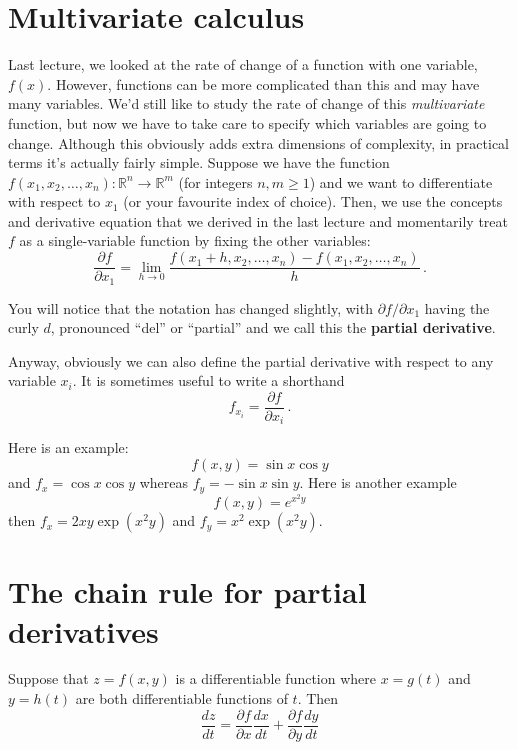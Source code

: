 \documentclass[12pt]{article}
\begin{document}
\section*{Multivariate calculus}
Last lecture, we looked at the rate of change of a function with one variable, $f(x)$. However, functions can be more complicated than this and may have many variables. We'd still like to study the rate of change of this \emph{multivariate} function, but now we have to take care to specify which variables are going to change. Although this obviously adds extra dimensions of complexity, in practical terms it's actually fairly simple. Suppose we have the function $f(x_1, x_2,\dots, x_n):\mathbb{R}^n \to \mathbb{R}^m$ (for integers $n,m\geq 1$) and we want to differentiate with respect to $x_1$ (or your favourite index of choice). Then, we use the concepts and derivative equation that we derived in the last lecture and momentarily treat $f$ as a single-variable function by fixing the other variables:
\begin{equation}\label{eq:partialderivative}
\frac{\partial f}{\partial x_1} = \lim_{h\to 0} \frac{f(x_1+h, x_2, \dots, x_n) - f(x_1,x_2,\dots, x_n)}{h}\,.
\end{equation}

You will notice that the notation has changed slightly,
with $\partial f/\partial x_1$ having the curly $d$, pronounced ``del''
or ``partial'' and we call this the \textbf{partial derivative}.

Anyway, obviously we can also define the partial derivative with respect to any variable $x_i$. 
It is sometimes useful to write a shorthand
\begin{equation}
  f_{x_i}=\frac{\partial f}{\partial x_i}\,.
\end{equation}

Here is an example:
\begin{equation}
  f(x,y)=\sin{x}\cos{y}
\end{equation}
and $f_x=\cos{x}\cos{y}$ whereas $f_y=-\sin{x}\sin{y}$. Here is another example 
\begin{equation}
  f(x,y)=e^{x^2y}
\end{equation}
then $f_x=2xy\exp{(x^2y)}$ and $f_y=x^2\exp{(x^2y)}$.

\section*{The chain rule for partial derivatives}
Suppose that $z = f(x,y)$ is a differentiable function where $x = g(t)$ and $y = h(t)$ are both differentiable functions of $t$. Then 
\[
\frac{dz}{dt} = \frac{\partial f}{\partial x} \frac{dx}{dt} + \frac{\partial f}{\partial y} \frac{dy}{dt}
\]
\end{document}
